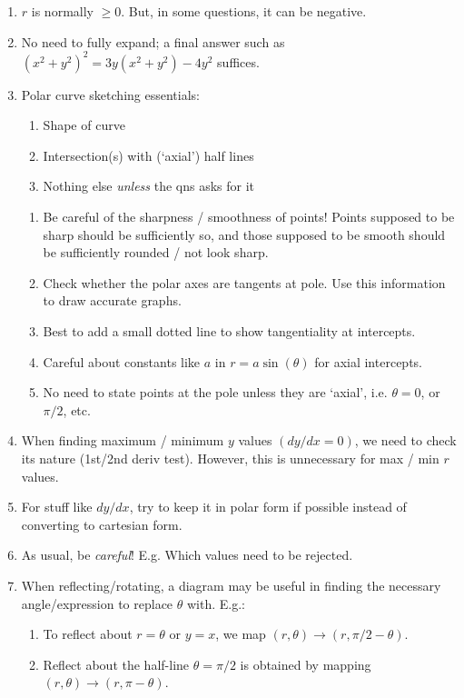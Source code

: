 \documentclass[oneside]{book}
\begin{document}
\begin{IN}
  \begin{enumerate}
    \item \(r\) is normally \(\geq 0\). But, in some questions, it can be negative.
    \item No need to fully expand; a final answer such as \((x^2+y^2)^2=3y(x^2+y^2)-4y^2\) suffices.
    \item Polar curve sketching essentials:
    \begin{enumerate}
      \item Shape of curve
      \item Intersection(s) with (`axial') half lines
      \item Nothing else \emph{unless} the qns asks for it
    \end{enumerate}
    \begin{enumerate}[label=\(\qed\)]
      \item Be careful of the sharpness / smoothness of points! Points supposed to be sharp should be sufficiently so, and those supposed to be smooth should be sufficiently rounded / not look sharp.
      \item Check whether the polar axes are tangents at pole. Use this information to draw accurate graphs.
      \item Best to add a small dotted line to show tangentiality at intercepts.
      \item Careful about constants like \(a\) in \(r=a\sin(\theta)\) for axial intercepts.
      \item No need to state points at the pole unless they are `axial', i.e. \(\theta=0\), or \(\pi/2\), etc.
    \end{enumerate}
    \item When finding maximum / minimum \(y\) values \(\left(dy/dx=0\right)\), we need to check its nature (1st/2nd deriv test). However, this is unnecessary for max / min \(r\) values.
    \item For stuff like \(dy/dx\), try to keep it in polar form if possible instead of converting to cartesian form.
    \item As usual, be \emph{careful}! E.g. Which values need to be rejected.
    \item When reflecting/rotating, a diagram may be useful in finding the necessary angle/expression to replace \(\theta\) with. E.g.: \small
    \begin{enumerate}
      \item To reflect about \(r=\theta\) or \(y=x\), we map \((r,\theta) \to (r,\pi/2-\theta)\).
      \item Reflect about the half-line \(\theta=\pi/2\) is obtained by mapping \((r,\theta) \to (r,\pi-\theta)\).
    \end{enumerate} \normalsize
  \end{enumerate}
\end{IN}
\end{document}
